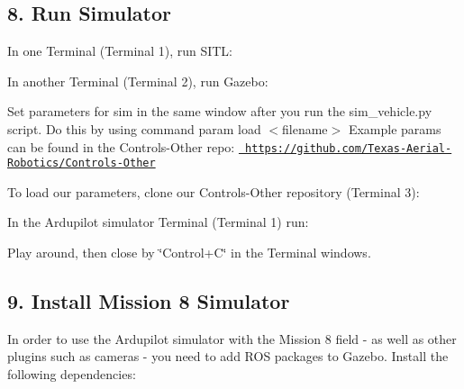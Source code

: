 \subsection*{8. Run Simulator}

In one Terminal (Terminal 1), run S\+I\+TL\+: 
\begin{DoxyCode}{0}
\end{DoxyCode}


In another Terminal (Terminal 2), run Gazebo\+: 
\begin{DoxyCode}{0}
\end{DoxyCode}


Set parameters for sim in the same window after you run the {\ttfamily sim\+\_\+vehicle.\+py script}. Do this by using command {\ttfamily param load $<$filename$>$} Example params can be found in the {\ttfamily Controls-\/\+Other} repo\+: \href{https://github.com/Texas-Aerial-Robotics/Controls-Other}{\texttt{ https\+://github.\+com/\+Texas-\/\+Aerial-\/\+Robotics/\+Controls-\/\+Other}}

To load our parameters, clone our {\ttfamily Controls-\/\+Other} repository (Terminal 3)\+: 
\begin{DoxyCode}{0}
\end{DoxyCode}
 In the Ardupilot simulator Terminal (Terminal 1) run\+: 
\begin{DoxyCode}{0}
\end{DoxyCode}
 Play around, then close by \char`\"{}\+Control+\+C\char`\"{} in the Terminal windows.

\subsection*{9. Install Mission 8 Simulator}

In order to use the Ardupilot simulator with the Mission 8 field -\/ as well as other plugins such as cameras -\/ you need to add R\+OS packages to Gazebo. Install the following dependencies\+: 
\begin{DoxyCode}{0}
\end{DoxyCode}


